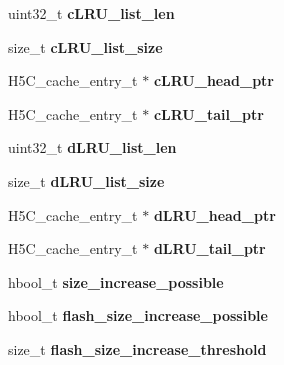 \begin{DoxyCompactItemize}
\item 
\mbox{\label{struct_h5_c__t_a16e592d8613fc9d4e7f1f36795983aee}} 
uint32\+\_\+t {\bfseries c\+L\+R\+U\+\_\+list\+\_\+len}
\item 
\mbox{\label{struct_h5_c__t_a35e76ba0c7000cd57320d4f885424c3e}} 
size\+\_\+t {\bfseries c\+L\+R\+U\+\_\+list\+\_\+size}
\item 
\mbox{\label{struct_h5_c__t_a014b8d1e8aa1ab2d24ccea88a0598d5d}} 
H5\+C\+\_\+cache\+\_\+entry\+\_\+t $\ast$ {\bfseries c\+L\+R\+U\+\_\+head\+\_\+ptr}
\item 
\mbox{\label{struct_h5_c__t_a0d61c96887a3661a26e6743832a23da7}} 
H5\+C\+\_\+cache\+\_\+entry\+\_\+t $\ast$ {\bfseries c\+L\+R\+U\+\_\+tail\+\_\+ptr}
\item 
\mbox{\label{struct_h5_c__t_a228d787f14f3a52b3285de739eb6ec8f}} 
uint32\+\_\+t {\bfseries d\+L\+R\+U\+\_\+list\+\_\+len}
\item 
\mbox{\label{struct_h5_c__t_a7d957471e9d1c3da8e3195bdccd5340c}} 
size\+\_\+t {\bfseries d\+L\+R\+U\+\_\+list\+\_\+size}
\item 
\mbox{\label{struct_h5_c__t_a65d223962ea973559572ef00a83c8dd5}} 
H5\+C\+\_\+cache\+\_\+entry\+\_\+t $\ast$ {\bfseries d\+L\+R\+U\+\_\+head\+\_\+ptr}
\item 
\mbox{\label{struct_h5_c__t_a36006a497289d1f0a62ed2637a75bf27}} 
H5\+C\+\_\+cache\+\_\+entry\+\_\+t $\ast$ {\bfseries d\+L\+R\+U\+\_\+tail\+\_\+ptr}
\item 
\mbox{\label{struct_h5_c__t_a3cfc83383d0737d3430982a518c35a83}} 
hbool\+\_\+t {\bfseries size\+\_\+increase\+\_\+possible}
\item 
\mbox{\label{struct_h5_c__t_a25a634f22dd5d0d3f53b65ddbecd90e6}} 
hbool\+\_\+t {\bfseries flash\+\_\+size\+\_\+increase\+\_\+possible}
\item 
\mbox{\label{struct_h5_c__t_a2807ed45084676eae91c280af3d879d6}} 
size\+\_\+t {\bfseries flash\+\_\+size\+\_\+increase\+\_\+threshold}

\end{DoxyCompactItemize}
